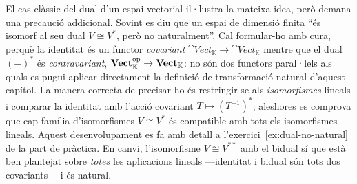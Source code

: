 \begin{observacio}
El cas clàssic del dual d'un espai vectorial il·lustra la mateixa idea, però demana una precaució addicional. Sovint es diu que un espai de dimensió finita \enquote{és isomorf al seu dual $V\cong V^*$, però no naturalment}. Cal formular-ho amb cura, perquè la identitat és un functor \emph{covariant} $\cat{Vect}_{\mathbb K}\to\cat{Vect}_{\mathbb K}$ mentre que el dual $(-)^*$ és \emph{contravariant}, $\mathbf{Vect}_{\mathbb K}^{\mathrm{op}}\to\mathbf{Vect}_{\mathbb K}$: no són dos functors paral·lels als quals es pugui aplicar directament la definició de transformació natural d'aquest capítol. La manera correcta de precisar-ho és restringir-se als \emph{isomorfismes} lineals i comparar la identitat amb l'acció covariant $T\mapsto(T^{-1})^*$; aleshores es comprova que cap família d'isomorfismes $V\cong V^*$ és compatible amb tots els isomorfismes lineals. Aquest desenvolupament es fa amb detall a l'exercici~\ref{ex:dual-no-natural} de la part de pràctica. En canvi, l'isomorfisme $V\cong V^{**}$ amb el bidual sí que està ben plantejat sobre \emph{totes} les aplicacions lineals ---identitat i bidual són tots dos covariants--- i és natural.
\end{observacio}


